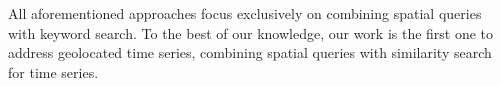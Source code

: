 All aforementioned approaches focus exclusively on combining spatial queries with keyword search. To the best of our knowledge, our work is the first one to address geolocated time series, combining spatial queries with similarity search for time series.








